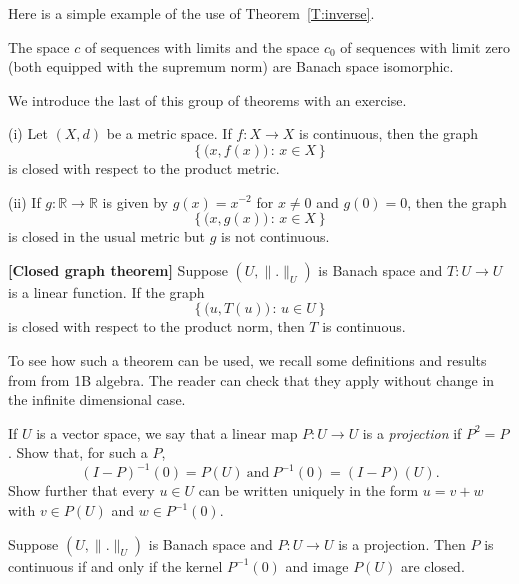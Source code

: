 Here is a simple example of the use of Theorem~\ref{T:inverse}.
\begin{exercise}\label{E;see isomorphism} 
The space $c$ of sequences with limits and the space
$c_{0}$ of sequences with limit zero (both equipped with the
supremum norm) are Banach space isomorphic.
\end {exercise}

We introduce the last of this group of theorems with an exercise.
\begin{exercise} (i) Let $(X,d)$ be a metric space.
If $f:X\rightarrow X$ is continuous, then the graph
\[\left\{\big(x,f(x)\big)\,:\,x\in X\right\}\]
is closed with respect to the product metric.

(ii) If $g:{\mathbb R}\rightarrow{\mathbb R}$ is given
by $g(x)=x^{-2}$ for $x\neq 0$ and $g(0)=0$, then
the graph
\[\left\{\big(x,g(x)\big)\,:\,x\in X\right\}\]
is closed in the usual metric but $g$ is not continuous.
\end{exercise}  
\begin{theorem}{\bf [Closed graph theorem]} Suppose $(U,\|.\|_{U})$
is  Banach space and $T:U\rightarrow U$ is a linear function.
If the graph
\[ \left\{\big(u,T(u)\big)\,:\,u\in U\right\}\]
is closed with respect to the product norm, then
$T$ is continuous.
\end{theorem}
To see how such a theorem can be used, we recall some definitions
and results from from 1B algebra. The reader can check that
they apply without change in the infinite dimensional case.
\begin{exercise} If $U$ is a vector space, we say that
a linear map $P:U\rightarrow U$ is a \emph{projection} if
$P^{2}=P$. Show that, for such a $P$,
\[(I-P)^{-1}(0)=P(U)\ \text{and}\ P^{-1}(0)=(I-P)(U).\]
Show further that every $u\in U$ can be written uniquely
in the form $u=v+w$ with $v\in P(U)$ and $w\in P^{-1}(0)$.
\end{exercise}
\begin{theorem}  Suppose $(U,\|.\|_{U})$
is  Banach space and $P:U\rightarrow U$ is a projection.
Then $P$ is continuous if and only if the kernel $P^{-1}(0)$
and image $P(U)$ are closed.
\end{theorem}
